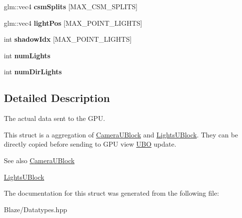 \begin{DoxyCompactItemize}
glm\+::vec4 {\bfseries csm\+Splits} \mbox{[}M\+A\+X\+\_\+\+C\+S\+M\+\_\+\+S\+P\+L\+I\+TS\mbox{]}
\item 
\mbox{\label{structblaze_1_1RendererUBlock_a63b4ebd129dc7dc4d0e64a5618de79e1}} 
glm\+::vec4 {\bfseries light\+Pos} \mbox{[}M\+A\+X\+\_\+\+P\+O\+I\+N\+T\+\_\+\+L\+I\+G\+H\+TS\mbox{]}
\item 
\mbox{\label{structblaze_1_1RendererUBlock_aff5efd6364d49d0f2b58bc67128e3f04}} 
int {\bfseries shadow\+Idx} \mbox{[}M\+A\+X\+\_\+\+P\+O\+I\+N\+T\+\_\+\+L\+I\+G\+H\+TS\mbox{]}
\item 
\mbox{\label{structblaze_1_1RendererUBlock_ab2879d6607b7cddb5119e3b294d6d5bb}} 
int {\bfseries num\+Lights}
\item 
\mbox{\label{structblaze_1_1RendererUBlock_a8daf3bed1ca11581c8c27bff0169e822}} 
int {\bfseries num\+Dir\+Lights}
\end{DoxyCompactItemize}


\subsection{Detailed Description}
The actual data sent to the G\+PU. 

This struct is a aggregation of \hyperlink{structblaze_1_1CameraUBlock}{Camera\+U\+Block} and \hyperlink{structblaze_1_1LightsUBlock}{Lights\+U\+Block}. They can be directly copied before sending to G\+PU view \hyperlink{classblaze_1_1UBO}{U\+BO} update.

\begin{DoxySeeAlso}{See also}
\hyperlink{structblaze_1_1CameraUBlock}{Camera\+U\+Block} 

\hyperlink{structblaze_1_1LightsUBlock}{Lights\+U\+Block} 
\end{DoxySeeAlso}


The documentation for this struct was generated from the following file\+:\begin{DoxyCompactItemize}
\item 
Blaze/Datatypes.\+hpp\end{DoxyCompactItemize}
